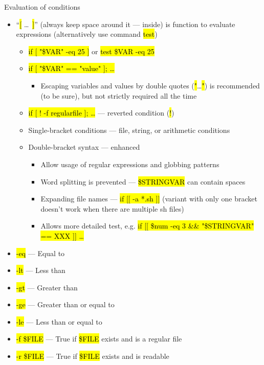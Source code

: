 \documentclass[compress, ucs, xelatex, 11pt, xcolor=svgnames,
  hyperref={
    bookmarks=true,
    unicode=true,
    colorlinks=true,
    pdftitle={Linux, command line and MetaCentrum},
    plainpages=false,
    pdfauthor={Vojtech Zeisek},
    pdfsubject={Course about use of Linux command line, writing shell scripts and using MetaCentrum of CESNET},
    pdfcreator={XeLaTeX},
    pdfkeywords={Linux, GNU, BASH, shell, command line, MetaCentrum},
    linkcolor=DarkRed,
    anchorcolor=DarkBlue,
    citecolor=Indigo,
    filecolor=NavyBlue,
    menucolor=DarkMagenta,
    urlcolor=DarkBlue,
    pdftex},
  url={hyphens, lowtilde} %
  ]{beamer}
\renewcommand{\texttt}[1]{\hl{\ttfamily #1}}
\begin{document}
\begin{frame}[allowframebreaks]{Evaluation of conditions}
  \begin{itemize}
    \item ``\texttt{[} \ldots~\texttt{]}'' (always keep space around it --- inside) is function to evaluate expressions (alternatively use command \texttt{test})
    \begin{itemize}
      \item \texttt{if [ "\$VAR" -eq 25 ]} or \texttt{test \$VAR -eq 25}
      \item \texttt{if [ "\$VAR" == "value" ]; \ldots}
      \begin{itemize}
	\item Escaping variables and values by double quotes (\texttt{"}\ldots\texttt{"}) is recommended (to be sure), but not strictly required all the time
      \end{itemize}
      \item \texttt{if [ ! -f regularfile ]; \ldots} --- reverted condition (\texttt{!})
      \item Single-bracket conditions --- file, string, or arithmetic conditions
      \item Double-bracket syntax --- enhanced
      \begin{itemize}
	\item Allow usage of regular expressions and globbing patterns
	\item Word splitting is prevented --- \texttt{\$STRINGVAR} can contain spaces
	\item Expanding file names --- \texttt{if [[ -a *.sh ]]} (variant with only one bracket doesn't work when there are multiple sh files)
	\item Allows more detailed test, e.g. \texttt{if [[ \$num -eq 3 \&\& "\$STRINGVAR" == XXX ]] \ldots}
      \end{itemize}
    \end{itemize}
    \item \texttt{-eq} --- Equal to
    \item \texttt{-lt} --- Less than
    \item \texttt{-gt} --- Greater than
    \item \texttt{-ge} --- Greater than or equal to
    \item \texttt{-le} --- Less than or equal to
    \item \texttt{-f \$FILE} --- True if \texttt{\$FILE} exists and is a regular file
    \item \texttt{-r \$FILE} --- True if \texttt{\$FILE} exists and is readable

\end{itemize}
\end{frame}
\end{document}

